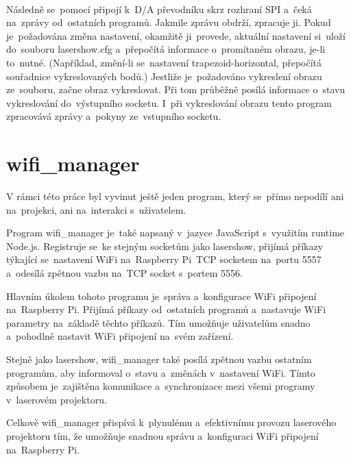 \





Následně se~pomocí připojí k~D/A převodníku skrz rozhraní SPI\cite{wiki-SPI} a~čeká na~zprávy od~ostatních programů. Jakmile zprávu obdrží, zpracuje ji.
Pokud je~požadována změna nastavení, okamžitě ji~provede, aktuální nastavení si~uloží do~souboru lasershow.cfg a~přepočítá informace o~promítaném obrazu, je-li to~nutné.
(Například, změní-li se~nastavení trapezoid-horizontal, přepočítá souřadnice vykreslovaných bodů.) Jestliže je~požadováno vykreslení obrazu ze~souboru, začne obraz vykreslovat.
Při tom průběžně posílá informace o~stavu vykreslování do~výstupního socketu. I~při vykreslování obrazu tento program zpracovává zprávy a~pokyny ze~vstupního socketu.




\section{wifi\_manager}

V rámci této práce byl vyvinut ještě jeden program, který se~přímo nepodílí ani na~projekci, ani na~interakci s~uživatelem.

Program wifi\_manager je~také napsaný v~jazyce JavaScript s~využitím runtime Node.js. Registruje se~ke stejným socketům jako lasershow, přijímá příkazy týkající se~nastavení WiFi na~Raspberry Pi~TCP socketem na~portu 5557 a~odesílá zpětnou vazbu na~TCP socket s~portem 5556.



Hlavním úkolem tohoto programu je~správa a~konfigurace WiFi připojení na~Raspberry Pi. Přijímá příkazy od~ostatních programů a~nastavuje WiFi parametry na~základě těchto příkazů. Tím umožňuje uživatelům snadno a~pohodlně nastavit WiFi připojení na~svém zařízení.

Stejně jako lasershow, wifi\_manager také posílá zpětnou vazbu ostatním programům, aby informoval o~stavu a~změnách v~nastavení WiFi. Tímto způsobem je~zajištěna komunikace a~synchronizace mezi všemi programy v~laserovém projektoru.

Celkově wifi\_manager přispívá k~plynulému a~efektivnímu provozu laserového projektoru tím, že umožňuje snadnou správu a~konfiguraci WiFi připojení na~Raspberry Pi.